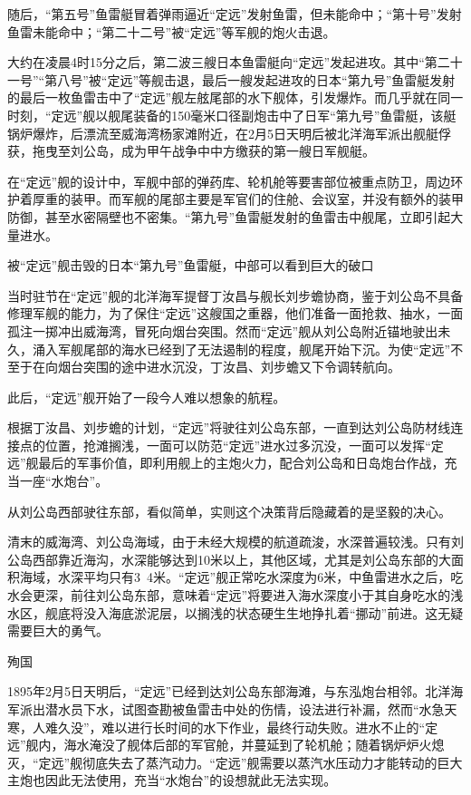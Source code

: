 \documentclass[12pt,UTF8]{ctexbook}
\begin{document}
随后，“第五号”鱼雷艇冒着弹雨逼近“定远”发射鱼雷，但未能命中；“第十号”发射鱼雷未能命中；“第二十二号”被“定远”等军舰的炮火击退。

大约在凌晨4时15分之后，第二波三艘日本鱼雷艇向“定远”发起进攻。其中“第二十一号”“第八号”被“定远”等舰击退，最后一艘发起进攻的日本“第九号”鱼雷艇发射的最后一枚鱼雷击中了“定远”舰左舷尾部的水下舰体，引发爆炸。而几乎就在同一时刻，“定远”舰以舰尾装备的150毫米口径副炮击中了日军“第九号”鱼雷艇，该艇锅炉爆炸，后漂流至威海湾杨家滩附近，在2月5日天明后被北洋海军派出舰艇俘获，拖曳至刘公岛，成为甲午战争中中方缴获的第一艘日军舰艇。

在“定远”舰的设计中，军舰中部的弹药库、轮机舱等要害部位被重点防卫，周边环护着厚重的装甲。而军舰的尾部主要是军官们的住舱、会议室，并没有额外的装甲防御，甚至水密隔壁也不密集。“第九号”鱼雷艇发射的鱼雷击中舰尾，立即引起大量进水。


被“定远”舰击毁的日本“第九号”鱼雷艇，中部可以看到巨大的破口

当时驻节在“定远”舰的北洋海军提督丁汝昌与舰长刘步蟾协商，鉴于刘公岛不具备修理军舰的能力，为了保住“定远”这艘国之重器，他们准备一面抢救、抽水，一面孤注一掷冲出威海湾，冒死向烟台突围。然而“定远”舰从刘公岛附近锚地驶出未久，涌入军舰尾部的海水已经到了无法遏制的程度，舰尾开始下沉。为使“定远”不至于在向烟台突围的途中进水沉没，丁汝昌、刘步蟾又下令调转航向。

此后，“定远”舰开始了一段今人难以想象的航程。

根据丁汝昌、刘步蟾的计划，“定远”将驶往刘公岛东部，一直到达刘公岛防材线连接点的位置，抢滩搁浅，一面可以防范“定远”进水过多沉没，一面可以发挥“定远”舰最后的军事价值，即利用舰上的主炮火力，配合刘公岛和日岛炮台作战，充当一座“水炮台”。

从刘公岛西部驶往东部，看似简单，实则这个决策背后隐藏着的是坚毅的决心。

清末的威海湾、刘公岛海域，由于未经大规模的航道疏浚，水深普遍较浅。只有刘公岛西部靠近海沟，水深能够达到10米以上，其他区域，尤其是刘公岛东部的大面积海域，水深平均只有3~4米。“定远”舰正常吃水深度为6米，中鱼雷进水之后，吃水会更深，前往刘公岛东部，意味着“定远”将要进入海水深度小于其自身吃水的浅水区，舰底将没入海底淤泥层，以搁浅的状态硬生生地挣扎着“挪动”前进。这无疑需要巨大的勇气。

殉国

1895年2月5日天明后，“定远”已经到达刘公岛东部海滩，与东泓炮台相邻。北洋海军派出潜水员下水，试图查勘被鱼雷击中处的伤情，设法进行补漏，然而“水急天寒，人难久没”，难以进行长时间的水下作业，最终行动失败。进水不止的“定远”舰内，海水淹没了舰体后部的军官舱，并蔓延到了轮机舱；随着锅炉炉火熄灭，“定远”舰彻底失去了蒸汽动力。“定远”舰需要以蒸汽水压动力才能转动的巨大主炮也因此无法使用，充当“水炮台”的设想就此无法实现。
\end{document}
